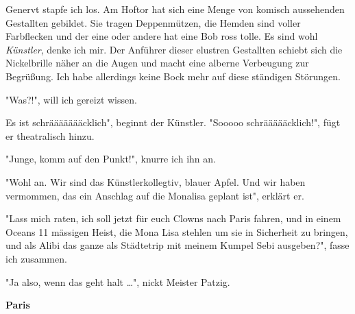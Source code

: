 \documentclass[20pt]{extarticle}
\begin{document}
Genervt stapfe ich los. Am Hoftor hat sich eine Menge von komisch
aussehenden Gestallten gebildet. Sie tragen Deppenmützen, die Hemden
sind voller Farbflecken und der eine oder andere hat eine Bob ross
tolle. Es sind wohl \emph{Künstler}, denke ich mir. Der Anführer dieser
elustren Gestallten schiebt sich die Nickelbrille näher an die Augen
und macht eine alberne Verbeugung zur Begrüßung. Ich habe allerdings
keine Bock mehr auf diese ständigen Störungen.

\begin{center}
"Was?!", will ich gereizt wissen.
\end{center}

\begin{center}
\grqq Es ist schräääääääcklich", beginnt der Künstler. "Sooooo
schräääääcklich!", fügt er theatralisch hinzu.
\end{center}

\begin{center}
"Junge, komm auf den Punkt!", knurre ich ihn an.
\end{center}

\begin{center}
"Wohl an. Wir sind das Künstlerkollegtiv, blauer Apfel. Und wir
haben vermommen, das ein Anschlag auf die Monalisa geplant ist",
erklärt er.
\end{center}

\begin{center}
"Lass mich raten, ich soll jetzt für euch Clowns nach Paris fahren,
und in einem Oceans 11 mässigen Heist, die Mona Lisa stehlen um sie
in Sicherheit zu bringen, und als Alibi das ganze als Städtetrip mit
meinem Kumpel Sebi ausgeben?", fasse ich zusammen.
\end{center}

\begin{center}
"Ja also, wenn das geht halt \dots{}", nickt Meister Patzig.
\end{center}

\textbf{Paris} \newline 
\end{document}
